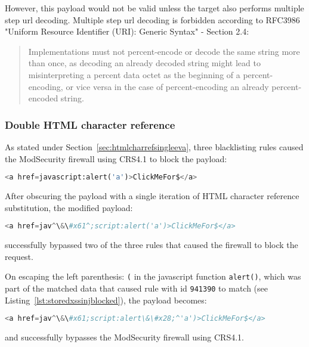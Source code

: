 However, this payload would not be valid unless the target also performs multiple step url decoding. Multiple step url decoding is forbidden according to RFC3986 "Uniform Resource Identifier (URI): Generic Syntax" - Section 2.4:
\begin{quote}
	Implementations must not
	percent-encode or decode the same string more than once, as decoding
	an already decoded string might lead to misinterpreting a percent
	data octet as the beginning of a percent-encoding, or vice versa in
	the case of percent-encoding an already percent-encoded string.
\end{quote}


\subsubsection{Double HTML character reference}
\label{sec:doublehtmlcharref}
As stated under Section~\ref{sec:htmlcharrefsingleeva}, three blacklisting rules caused the ModSecurity firewall using CRS4.1 to block the payload:

\begin{lstlisting}[style=basicStyle, language=Python]
<a href=javascript:alert('a')>ClickMeFor$</a>
\end{lstlisting}

After obscuring the payload with a single iteration of HTML character reference substitution, the modified payload:

\begin{lstlisting}[style=basicStyle, language=Python, escapeinside=\^\^]
<a href=jav^\&\#x61^;script:alert('a')>ClickMeFor$</a>
\end{lstlisting}

successfully bypassed two of the three rules that caused the firewall to block the request.

On escaping the left parenthesis: \verb|(| in the javascript function \verb|alert()|, which was part of the matched data that caused rule with id \verb|941390| to match (see Listing~\ref{lst:storedxssinjblocked}), the payload becomes:

\begin{lstlisting}[style=basicStyle, language=Python, caption=HTML character reference bypass, label={lst:htmlcharacterreferencebypass}, escapeinside=\^\^]
<a href=jav^\&\#x61;script:alert\&\#x28;^'a')>ClickMeFor$</a>
\end{lstlisting}

and successfully bypasses the ModSecurity firewall using CRS4.1.


